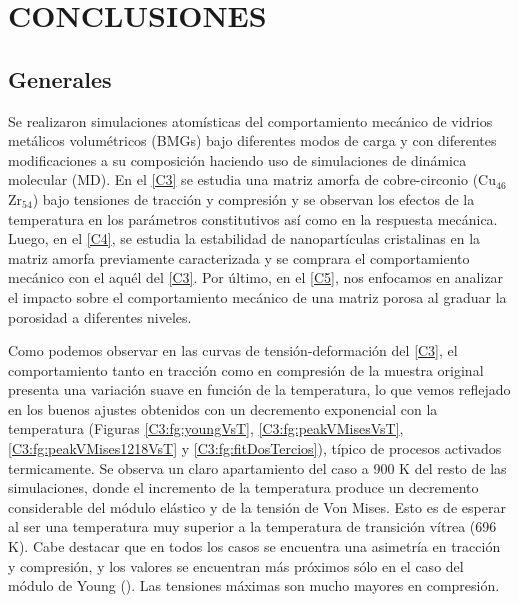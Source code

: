 
\chapter{CONCLUSIONES} %

\label{C6} %



\section{Generales}

Se realizaron simulaciones atomísticas del comportamiento mecánico de vidrios metálicos volumétricos (BMGs) bajo diferentes modos de carga y con diferentes modificaciones a su composición haciendo uso de simulaciones de dinámica molecular (MD). En el \cref{C3} se estudia una matriz amorfa de cobre-circonio (Cu$_{46}$Zr$_{54}$) bajo tensiones de tracción y compresión y se observan los efectos de la temperatura en los parámetros constitutivos así como en la respuesta mecánica. Luego, en el \cref{C4}, se estudia la estabilidad de nanopartículas cristalinas en la matriz amorfa previamente caracterizada y se comprara el comportamiento mecánico con el aquél del \cref{C3}. Por último, en el \cref{C5}, nos enfocamos en analizar el impacto sobre el comportamiento mecánico de una matriz porosa al graduar la porosidad a diferentes niveles.

Como podemos observar en las curvas de tensión-deformación del \cref{C3}, el comportamiento tanto en tracción como en compresión de la muestra original presenta una variación suave en función de la temperatura, lo que vemos reflejado en los buenos ajustes obtenidos con un decremento exponencial con la temperatura (Figuras \ref{C3:fg:youngVsT}, \ref{C3:fg:peakVMisesVsT}, \ref{C3:fg:peakVMises1218VsT} y \ref{C3:fg:fitDosTercios}), típico de procesos activados termicamente. Se observa un claro apartamiento del caso a 900 K del resto de las simulaciones, donde el incremento de la temperatura produce un decremento considerable del módulo elástico y de la tensión de Von Mises. Esto es de esperar al ser una temperatura muy superior a la temperatura de transición vítrea (696 K). Cabe destacar que en todos los casos se encuentra una asimetría en tracción y compresión, y los valores se encuentran más próximos sólo en el caso del módulo de Young (). Las tensiones máximas son mucho mayores en compresión.

